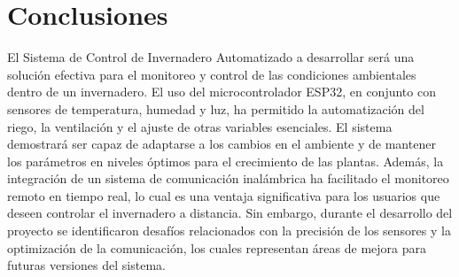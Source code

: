 \documentclass[../main]{subfiles}
\begin{document}
\section{Conclusiones}
    El Sistema de Control de Invernadero Automatizado a desarrollar será
    una solución efectiva para el monitoreo y control de las condiciones ambientales
    dentro de un invernadero.
    El uso del microcontrolador ESP32, en conjunto con sensores de temperatura,
    humedad y luz, ha permitido la automatización del riego, la ventilación y el
    ajuste de otras variables esenciales.
    El sistema demostrará ser capaz de adaptarse a los cambios en el ambiente y de
    mantener los parámetros en niveles óptimos para el crecimiento de las plantas.
    Además, la integración de un sistema de comunicación inalámbrica ha facilitado
    el monitoreo remoto en tiempo real, lo cual es una ventaja significativa para
    los usuarios que deseen controlar el invernadero a distancia.
    Sin embargo, durante el desarrollo del proyecto se identificaron desafíos
    relacionados con la precisión de los sensores y la optimización de la
    comunicación, los cuales representan áreas de mejora para futuras versiones del
    sistema.
\end{document}
